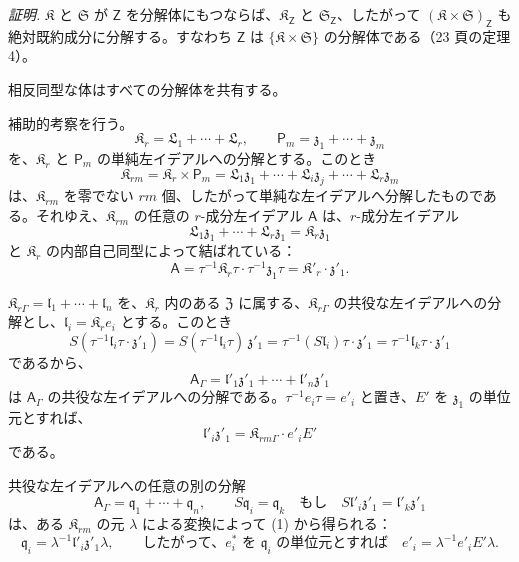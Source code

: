 \emph{証明.} \(\mathfrak K\) と \(\mathfrak S\) が \(\mathsf{Z}\) を分解体にもつならば、\(\mathfrak K_{\mathsf{Z}}\) と \(\mathfrak S_{\mathsf{Z}}\)、したがって \((\mathfrak K\times\mathfrak S)_{\mathsf{Z}}\) も絶対既約成分に分解する。すなわち \(\mathsf{Z}\) は \(\{\mathfrak K\times\mathfrak S\}\) の分解体である（23 頁の定理 4）。

相反同型な体はすべての分解体を共有する。

補助的考察を行う。
\[
\mathfrak K_r=\mathfrak L_1+\cdots+\mathfrak L_r,\qquad
\mathsf P_m=\mathfrak z_1+\cdots+\mathfrak z_m
\]
を、\(\mathfrak K_r\) と \(\mathsf P_m\) の単純左イデアルへの分解とする。このとき
\[
\mathfrak K_{rm}=\mathfrak K_r\times\mathsf P_m
=\mathfrak L_1\mathfrak z_1+\cdots+\mathfrak L_i\mathfrak z_j+\cdots+\mathfrak L_r\mathfrak z_m
\]
は、\(\mathfrak K_{rm}\) を零でない \(rm\) 個、したがって単純な左イデアルへ分解したものである。それゆえ、\(\mathfrak K_{rm}\) の任意の \(r\)-成分左イデアル \(\mathsf{A}\) は、\(r\)-成分左イデアル
\[
\mathfrak L_1\mathfrak z_1+\cdots+\mathfrak L_r\mathfrak z_1=\mathfrak K_r\mathfrak z_1
\]
と \(\mathfrak K_r\) の内部自己同型によって結ばれている：
\[
\mathsf{A}=\tau^{-1}\mathfrak K_r\tau\cdot\tau^{-1}\mathfrak z_1\tau
=\mathfrak K'_r\cdot\mathfrak z'_1.
\]

\(\mathfrak K_{r\Gamma}=\mathfrak l_1+\cdots+\mathfrak l_n\) を、\(\mathfrak K_r\) 内のある \(\mathfrak Z\) に属する、\(\mathfrak K_{r\Gamma}\) の共役な左イデアルへの分解とし、\(\mathfrak l_i=\mathfrak K_re_i\) とする。このとき
\[
S(\tau^{-1}\mathfrak l_i\tau\cdot\mathfrak z'_1)
=S(\tau^{-1}\mathfrak l_i\tau)\,\mathfrak z'_1
=\tau^{-1}(S\mathfrak l_i)\tau\cdot\mathfrak z'_1
=\tau^{-1}\mathfrak l_k\tau\cdot\mathfrak z'_1
\]
であるから、
\[
\tag{1}
\mathsf{A}_\Gamma=\mathfrak l'_1\mathfrak z'_1+\cdots+\mathfrak l'_n\mathfrak z'_1
\]
は \(\mathsf{A}_\Gamma\) の共役な左イデアルへの分解である。\(\tau^{-1}e_i\tau=e'_i\) と置き、\(E'\) を \(\mathfrak z_1\) の単位元とすれば、
\[
\mathfrak l'_i\mathfrak z'_1=\mathfrak K_{rm\Gamma}\cdot e'_iE'
\]
である。

共役な左イデアルへの任意の別の分解
\[
\tag{2}
\mathsf{A}_\Gamma=\mathfrak q_1+\cdots+\mathfrak q_n,\qquad
S\mathfrak q_i=\mathfrak q_k\quad\text{もし}\quad
S\mathfrak l'_i\mathfrak z'_1=\mathfrak l'_k\mathfrak z'_1
\]
は、ある \(\mathfrak K_{rm}\) の元 \(\lambda\) による変換によって (1) から得られる：
\[
\mathfrak q_i=\lambda^{-1}\mathfrak l'_i\mathfrak z'_1\lambda,
\qquad
\text{したがって、\(e_i^*\) を \(\mathfrak q_i\) の単位元とすれば}\quad
e'_i=\lambda^{-1}e'_iE'\lambda.
\]

